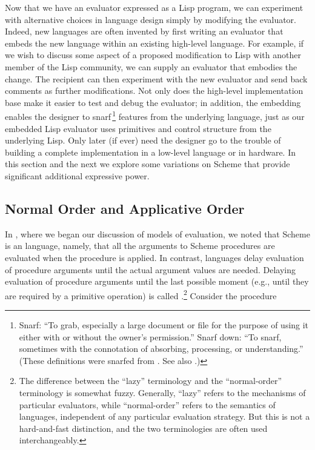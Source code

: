 Now that we have an evaluator expressed as a Lisp program, we can experiment
with alternative choices in language design simply by modifying the evaluator.
Indeed, new languages are often invented by first writing an evaluator that
embeds the new language within an existing high-level language.  For example,
if we wish to discuss some aspect of a proposed modification to Lisp with
another member of the Lisp community, we can supply an evaluator that embodies
the change.  The recipient can then experiment with the new evaluator and send
back comments as further modifications.  Not only does the high-level
implementation base make it easier to test and debug the evaluator; in
addition, the embedding enables the designer to snarf\,\footnote{Snarf: ``To
grab, especially a large document or file for the purpose of using it either
with or without the owner's permission.''  Snarf down: ``To snarf, sometimes
with the connotation of absorbing, processing, or understanding.''  (These
definitions were snarfed from .  See also .)}
features from the underlying language, just as our embedded Lisp evaluator uses
primitives and control structure from the underlying Lisp.  Only later (if
ever) need the designer go to the trouble of building a complete implementation
in a low-level language or in hardware.  In this section and the next we
explore some variations on Scheme that provide significant additional
expressive power.



\subsection{Normal Order and Applicative Order}
\label{Section 4.2.1}

In , where we began our discussion of models of evaluation, we
noted that Scheme is an  language, namely, that all
the arguments to Scheme procedures are evaluated when the procedure is applied.
In contrast,  languages delay evaluation of procedure
arguments until the actual argument values are needed.  Delaying evaluation of
procedure arguments until the last possible moment (e.g., until they are
required by a primitive operation) is called .\footnote{The difference between the ``lazy'' terminology and the
``normal-order'' terminology is somewhat fuzzy.  Generally, ``lazy'' refers to
the mechanisms of particular evaluators, while ``normal-order'' refers to the
semantics of languages, independent of any particular evaluation strategy.  But
this is not a hard-and-fast distinction, and the two terminologies are often
used interchangeably.}  Consider the procedure

